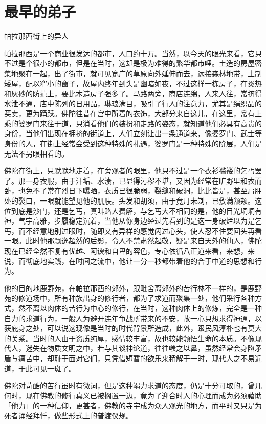 \documentclass[12pt,twoside,openany]{book}
\begin{document}
\section{最早的弟子}\label{sec2.4}

帕拉那西街上的异人

帕拉那西是一个商业很发达的都市，人口约十万。当然，以今天的眼光来看，它只不过是个很小的都市，但是在当时，这却是极为难得的繁华都市哩。土造的房屋密集地聚在一起，出了街市，就可见宽广的草原向外延伸而去，远接森林地带，土制矮屋，配以窄小的窗子，故屋内终年到头是幽暗如夜，不过这样一栋房子，在炎热和灰砂的防范上，要比木造房子强多了。马路两旁，商店连绵，人来人往，常挤得水泄不通，店中陈列的日用品，琳琅满目，吸引了行人的注意力，尤其是绢织品的买卖，更为踊跃。佛陀往昔在宫中所着的衣饰，大部分来自这儿，在这里，常有上乘的婆罗门来往于道，只消看他们的装扮和走路的姿态，就知道他们必具有高贵的身份，当他们出现在拥挤的街道上，人们立刻让出一条通道来，像婆罗门、武士等身份的人，在街上经常会受到这种特殊的礼遇，婆罗门是一种特殊的阶层，人们是无法不另眼相看的。

佛陀在街上，只默默地走着，在旁观者的眼里，他只不过是一个衣衫褴褛的乞丐罢了。那一身衣服，由于汗垢、水渍，已显得污秽不堪，又因为经常在旷野里和衣而卧，也免不了常在烈日下曝晒，衣质已很脆弱，裂缝和破洞，比比皆是，甚至肩胛处的裂口，一眼就能望见他的肌肤。头发和胡须，由于竟月未剃，已敷满颔颊。这位到底是沙门，还是乞丐，真叫路人费解，与乞丐大不相同的是，他的目光垌垌有神，气宇高雅，步履稳定沉着，当他从你身边经过先看到的是这一身破烂以为是乞丐，而不经意地别过眼时，随即又有异样的感觉闪过心头，使人忍不住要回头再看一眼。此时他那飘逸超然的后影，令人不禁肃然起敬，疑是来自天外的仙人，佛陀现在已经全然不复有优越、阿谀和自卑的容色，专心依循八正道来看，来想，来说，而彻底地实践，在时间之流中，他让一分一秒都带着他的合于中道的思想和行为。

他的目的地鹿野苑，在帕拉那西的郊外，跟毗舍离郊外的苦行林不一样的，是鹿野苑的修道场中，所有种族出身的修行者，都为了求道而聚集一处，他们采行各种方式，然不离以肉体的苦行为中心的修行，在当时，这种肉体上的修炼，完全是一种自力的求道行为，一般人为避开连年争战所带来的不安，故一心只想求得神通，以获庇身之处，可以说这现像是当时的时代背景所造成，此外，跟民风淳朴也有莫大的关系。当时的人由于资质纯厚，感情较丰富，故也较能领悟生命的本质。不像现代人，迷失在物质文明之中，若与其谈神论道，往往嗤之以鼻，虽然经常会身陷矛盾与痛苦中，却耻于面对它们，只凭借短暂的欲乐来稍解于一时，现代人之不易近道，于此可见一斑了。

佛陀对苛酷的苦行虽时有微词，但是这种竭力求道的态度，仍是十分可取的，曾几何时，现在佛教的修行真义已被搁置一边，竟为了迎合时人的心理而成为必须藉助「他力」的一种信仰，更甚者，佛教的寺宇成为众人观光的地方，而平时又只是为死者诵经拜忏，做些形式上的普渡仪规。
\end{document}
